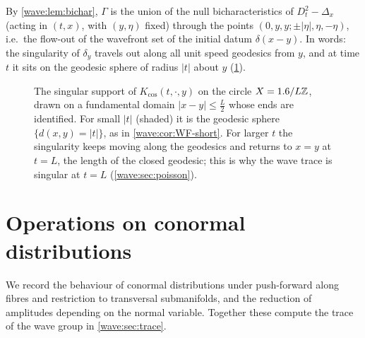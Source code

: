 By \cref{wave:lem:bichar}, $\Gamma$ is the union of the null bicharacteristics of
$D_t^2-\Delta_x$ (acting in $(t,x)$, with $(y,\eta)$ fixed) through the points
$(0,y,y;\pm|\eta|,\eta,-\eta)$, i.e.\ the flow-out of the wavefront set of the
initial datum $\delta(x-y)$. In words: the singularity of $\delta_y$ travels out
along all unit speed geodesics from $y$, and at time $t$ it sits on the geodesic
sphere of radius $|t|$ about $y$ (\cref{wave:fig:wavefront}).

\begin{figure}[ht]
  \centering
  \caption{The singular support of $K_{\cos}(t,\cdot,y)$ on the circle
  $X=1.6/L\mathbb{Z}$, drawn on a fundamental domain $|x-y|\le\frac L2$ whose ends are
  identified. For small $|t|$ (shaded) it is the geodesic sphere $\{d(x,y)=|t|\}$, as
  in \cref{wave:cor:WF-short}. For larger $t$ the singularity keeps moving along the
  geodesics and returns to $x=y$ at $t=L$, the length of the closed geodesic; this is
  why the wave trace is singular at $t=L$ (\cref{wave:sec:poisson}).}
  \label{wave:fig:wavefront}
\end{figure}

\section{Operations on conormal distributions}\label{wave:sec:operations}

We record the behaviour of conormal distributions under push-forward along
fibres and restriction to transversal submanifolds, and the reduction of
amplitudes depending on the normal variable. Together these compute the trace
of the wave group in \cref{wave:sec:trace}.

